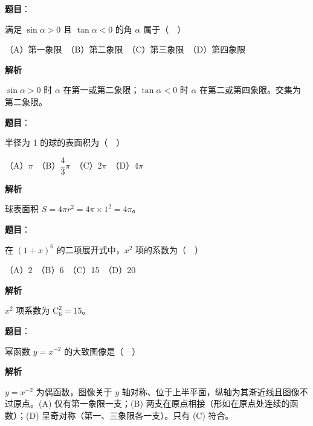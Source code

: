 \begin{answer}

\textbf{题目}：

满足 \(\sin\alpha>0\) 且 \(\tan\alpha<0\) 的角 \(\alpha\) 属于（　）

（A）第一象限　（B）第二象限　（C）第三象限　（D）第四象限

\textbf{解析}

\(\sin\alpha>0\) 时 \(\alpha\) 在第一或第二象限；\(\tan\alpha<0\) 时 \(\alpha\) 在第二或第四象限。交集为第二象限。


\end{answer}
\begin{answer}

\textbf{题目}：

半径为 1 的球的表面积为（　）

（A）\(\pi\)　（B）\(\dfrac{4}{3}\pi\)　（C）\(2\pi\)　（D）\(4\pi\)

\textbf{解析}

球表面积 \(S=4\pi r^{2}=4\pi\times 1^{2}=4\pi\)。


\end{answer}
\begin{answer}

\textbf{题目}：

在 \((1+x)^{6}\) 的二项展开式中，\(x^{2}\) 项的系数为（　）

（A）2　（B）6　（C）15　（D）20

\textbf{解析}

\(x^{2}\) 项系数为 \(\mathrm{C}_{6}^{2}=15\)。


\end{answer}
\begin{answer}

\textbf{题目}：

幂函数 \(y=x^{-2}\) 的大致图像是（　）
\nopagebreak[4]
\begin{center}\end{center}
\nopagebreak[4]
\textbf{解析}

\(y=x^{-2}\) 为偶函数，图像关于 \(y\) 轴对称、位于上半平面，纵轴为其渐近线且图像不过原点。(A) 仅有第一象限一支；(B) 两支在原点相接（形如在原点处连续的函数）；(D) 呈奇对称（第一、三象限各一支）。只有 (C) 符合。


\end{answer}
